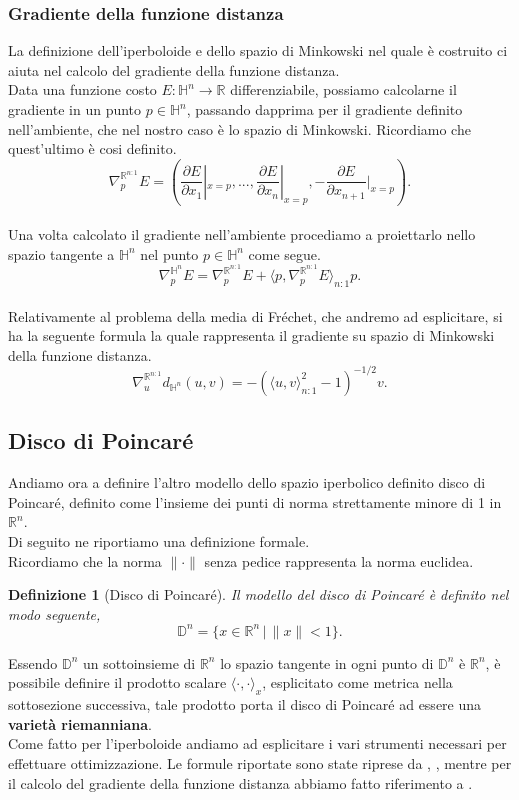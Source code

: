 \documentclass[a4paper, 12pt]{article}
\newtheorem{definition}{Definizione}
\begin{document}
\subsubsection{Gradiente della funzione distanza}
La definizione dell'iperboloide e dello spazio di Minkowski nel quale è costruito ci aiuta nel calcolo del gradiente della funzione distanza.\\
Data una funzione costo $E:\mathbb{H}^n \to \mathbb{R}$ differenziabile, possiamo calcolarne il gradiente in un punto $p \in \mathbb{H}^n$, passando dapprima per il gradiente definito nell'ambiente, che nel nostro caso è lo spazio di Minkowski. Ricordiamo che quest'ultimo è cosi definito.\\
\[\nabla_{p}^{\mathbb{R}^{n:1}} E = \left (\frac{\partial E}{\partial x_1}|_{x=p}, ..., \frac{\partial E}{\partial x_n}|_{x=p}, -\frac{\partial E}{\partial x_{n+1}}|_{x=p} \right).\]\\
Una volta calcolato il gradiente nell'ambiente procediamo a proiettarlo nello spazio tangente a $\mathbb{H}^n$ nel punto $p \in \mathbb{H}^n$ come segue.\\
\[\nabla_{p}^{\mathbb{H}^n} E = \nabla_{p}^{\mathbb{R}^{n:1}} E + \langle p, \nabla_{p}^{\mathbb{R}^{n:1}} E \rangle_{n:1} p.\]\\
Relativamente al problema della media di Fréchet, che andremo ad esplicitare, si ha la seguente formula la quale rappresenta il gradiente su spazio di Minkowski della funzione distanza.\\
\[\nabla_u^{\mathbb{R}^{n:1}} d_{\mathbb{H}^n}(u,v) = - (\langle u,v \rangle_{n:1}^2 - 1)^{-1/2} v.\]
\subsection{Disco di Poincaré}
Andiamo ora a definire l'altro modello dello spazio iperbolico definito disco di Poincaré, definito come l'insieme dei punti di norma strettamente minore di 1 in $\mathbb{R}^n$.\\
Di seguito ne riportiamo una definizione formale.\\
Ricordiamo che la norma $\| \cdot \|$ senza pedice rappresenta la norma euclidea.\\
\begin{definition}[Disco di Poincaré]
Il modello del disco di Poincaré è definito nel modo seguente,\\
\[ \mathbb{D}^n = \{x \in \mathbb{R}^n \, | \, \| x \| < 1\}.\]
\end{definition}
Essendo $\mathbb{D}^n$ un sottoinsieme di $\mathbb{R}^n$ lo spazio tangente in ogni punto di $\mathbb{D}^n$ è $\mathbb{R}^n$, è possibile definire il prodotto scalare $\langle \cdot, \cdot \rangle_x$, esplicitato come metrica nella sottosezione successiva, tale prodotto porta il disco di Poincaré ad essere una \textbf{varietà riemanniana}.\\
Come fatto per l'iperboloide andiamo ad esplicitare i vari strumenti necessari per effettuare ottimizzazione. Le formule riportate sono state riprese da \cite{GeoOpt}, \cite{Ganea}, mentre per il calcolo del gradiente della funzione distanza abbiamo fatto riferimento a \cite{Nickel}.
\end{document}
